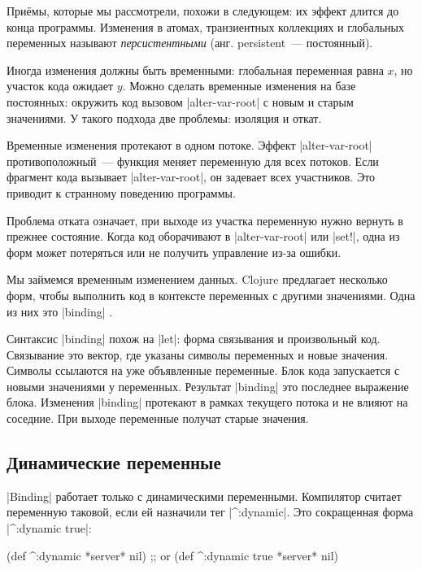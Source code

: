 При\"{е}мы, которые мы рассмотрели, похожи в следующем: их эффект длится до конца
программы. Изменения в атомах, транзиентных коллекциях и глобальных переменных
называют \emph{персистентными} (анг. persistent~--- постоянный).

Иногда изменения должны быть временными: глобальная переменная равна $x$, но
участок кода ожидает $y$. Можно сделать временные изменения на базе постоянных:
окружить код вызовом \spverb|alter-var-root| с новым и старым значениями. У
такого подхода две проблемы: изоляция и откат.

Временные изменения протекают в одном потоке. Эффект \spverb|alter-var-root|
противоположный~--- функция меняет переменную для всех потоков. Если фрагмент
кода вызывает \spverb|alter-var-root|, он задевает всех участников. Это приводит
к странному поведению программы.

Проблема отката означает, при выходе из участка переменную нужно вернуть в
прежнее состояние. Когда код оборачивают в \spverb|alter-var-root| или
\spverb|set!|, одна из форм может потеряться или не получить управление из-за
ошибки.

Мы займемся временным изменением данных. Clojure предлагает несколько форм,
чтобы выполнить код в контексте переменных с другими значениями. Одна из них это
\spverb|binding| .

Синтаксис \spverb|binding| похож на \spverb|let|: форма связывания и
произвольный код. Связывание это вектор, где указаны символы переменных и новые
значения. Символы ссылаются на уже объявленные переменные. Блок кода запускается
с новыми значениями у переменных. Результат \spverb|binding| это последнее
выражение блока. Изменения \spverb|binding| протекают в рамках текущего потока и
не влияют на соседние. При выходе переменные получат старые значения.

\subsection{Динамические переменные}

\label{dynamic-vars}

\spverb|Binding| работает только с динамическими переменными. Компилятор считает
переменную таковой, если ей назначили тег \spverb|^:dynamic|. Это сокращенная
форма \spverb|^{:dynamic true}|:

\begin{english}
  \begin{clojure}
(def ^:dynamic *server* nil)
;; or
(def ^{:dynamic true} *server* nil)
  \end{clojure}
\end{english}

